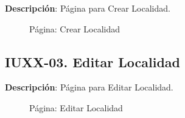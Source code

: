 \textbf{Descripción}: Página para Crear Localidad.\\

\begin{figure}[H]
	\label{tab:ui-create-localidad-page}
	\caption{Página: Crear Localidad}
\end{figure}

\begin{table}[H]
	\caption{Forma: Crear Localidad}
	\label{tab:ui-create-localidad-form}
\end{table}

\clearpage
\subsection{IUXX-03. Editar Localidad} \label{sec:ui-page-update-localidad}

\textbf{Descripción}: Página para Editar Localidad.\\

\begin{figure}[H]
	\label{tab:ui-edit-localidad-page}
	\caption{Página: Editar Localidad}
\end{figure}

